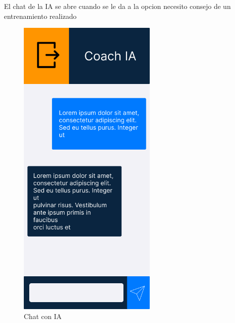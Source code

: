 El chat de la IA se abre cuando se le da a la opcion necesito consejo de un entrenamiento realizado
\begin{figure}[H]
   \centering
    \includegraphics[width=0.6\textwidth]{fotos/Frame 32.png}
    \caption{Chat con IA}
    \label{fig:Chat con IA}
\end{figure}

